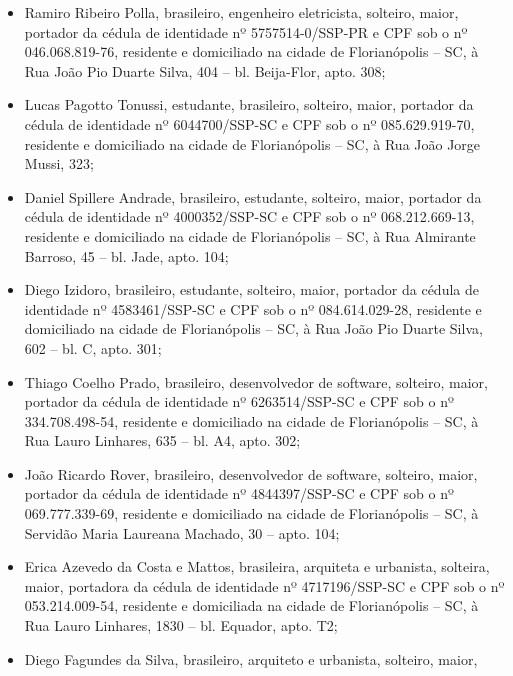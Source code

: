 \documentclass[a4paper]{report}
\begin{document}
\begin{enumerate}
      \begin{itemize}
      \item Ramiro Ribeiro Polla, brasileiro, engenheiro eletricista, solteiro, maior,
            portador da cédula de identidade nº 5757514-0/SSP-PR
            e CPF sob o nº 046.068.819-76,
            residente e domiciliado na cidade de
            Florianópolis – SC, à Rua João Pio Duarte Silva, 404 – bl. Beija-Flor, apto. 308;
      \item Lucas Pagotto Tonussi, estudante, brasileiro, solteiro, maior,
            portador da cédula de identidade nº 6044700/SSP-SC
            e CPF sob o nº 085.629.919-70,
            residente e domiciliado na cidade de
            Florianópolis – SC, à Rua João Jorge Mussi, 323;
      \item Daniel Spillere Andrade, brasileiro, estudante, solteiro, maior,
            portador da cédula de identidade nº 4000352/SSP-SC
            e CPF sob o nº 068.212.669-13,
            residente e domiciliado na cidade de
            Florianópolis – SC, à Rua Almirante Barroso, 45 – bl. Jade, apto. 104;
      \item Diego Izidoro, brasileiro, estudante, solteiro, maior,
            portador da cédula de identidade nº 4583461/SSP-SC
            e CPF sob o nº 084.614.029-28,
            residente e domiciliado na cidade de
            Florianópolis – SC, à Rua João Pio Duarte Silva, 602 – bl. C, apto. 301;
      \item Thiago Coelho Prado, brasileiro, desenvolvedor de software, solteiro, maior,
            portador da cédula de identidade nº 6263514/SSP-SC
            e CPF sob o nº 334.708.498-54,
            residente e domiciliado na cidade de
            Florianópolis – SC, à Rua Lauro Linhares, 635 – bl. A4, apto. 302;
      \item João Ricardo Rover, brasileiro, desenvolvedor de software, solteiro, maior,
            portador da cédula de identidade nº 4844397/SSP-SC
            e CPF sob o nº 069.777.339-69,
            residente e domiciliado na cidade de
            Florianópolis – SC, à Servidão Maria Laureana Machado, 30 – apto. 104;
      \item Erica Azevedo da Costa e Mattos, brasileira, arquiteta e urbanista, solteira, maior,
            portadora da cédula de identidade nº 4717196/SSP-SC
            e CPF sob o nº 053.214.009-54,
            residente e domiciliada na cidade de
            Florianópolis – SC, à Rua Lauro Linhares, 1830 – bl. Equador, apto. T2;
      \item Diego Fagundes da Silva, brasileiro, arquiteto e urbanista, solteiro, maior,

\end{itemize}
\end{enumerate}
\end{document}
